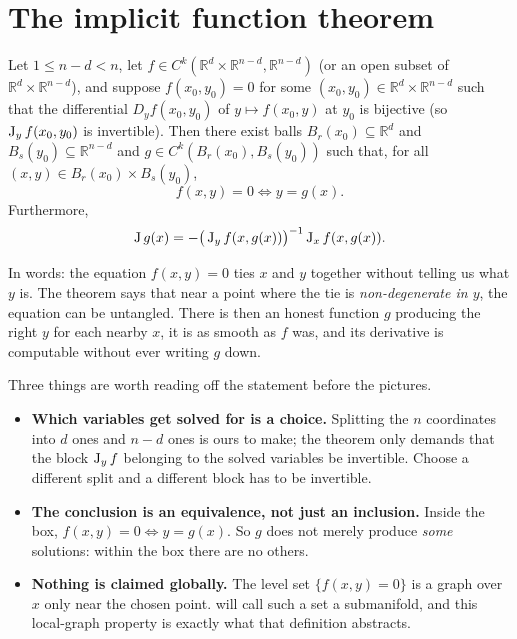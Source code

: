 
\section{The implicit function theorem}
\label{sec:implicit_function_theorem}

\begin{theorem}
\label{thm:implicit_function_theorem}
Let $1 \leq n-d < n$, let $f \in C^k(\mathbb{R}^d\times\mathbb{R}^{n-d}, \mathbb{R}^{n-d})$ (or an
open subset of $\mathbb{R}^d\times\mathbb{R}^{n-d}$), and suppose $f(x_0,y_0) = 0$ for some
$(x_0,y_0) \in \mathbb{R}^d\times\mathbb{R}^{n-d}$ such that the differential $D_yf(x_0,y_0)$ of
$y \mapsto f(x_0,y)$ at $y_0$ is bijective (so $\operatorname{J}_yf(x_0,y_0)$ is invertible). Then there exist
balls $B_r(x_0) \subseteq \mathbb{R}^d$ and $B_s(y_0) \subseteq \mathbb{R}^{n-d}$ and
$g \in C^k(B_r(x_0), B_s(y_0))$ such that, for all $(x,y) \in B_r(x_0)\times B_s(y_0)$,
\[f(x,y) = 0 \iff y = g(x).\]
Furthermore,
\[\operatorname{J} g(x) = -\big(\operatorname{J}_yf(x,g(x))\big)^{-1}\operatorname{J}_xf(x,g(x)).\]
\end{theorem}

In words: the equation $f(x,y)=0$ ties $x$ and $y$ together without telling us what $y$ is. The
theorem says that near a point where the tie is \emph{non-degenerate in $y$}, the equation can be
untangled. There is then an honest function $g$ producing the right $y$ for each nearby $x$, it is
as smooth as $f$ was, and its derivative is computable without ever writing $g$ down.

Three things are worth reading off the statement before the pictures.
\begin{itemize}
  \item \textbf{Which variables get solved for is a choice.} Splitting the $n$ coordinates into
    $d$  ones and $n-d$  ones is ours to make; the theorem only demands that
    the block $\operatorname{J}_yf$ belonging to the solved variables be invertible. Choose a different
    split and a different block has to be invertible.
  \item \textbf{The conclusion is an equivalence, not just an inclusion.} Inside the box,
    $f(x,y)=0 \iff y=g(x)$. So $g$ does not merely produce \emph{some} solutions: within the
    box there are no others.
  \item \textbf{Nothing is claimed globally.} The level set $\{f(x,y)=0\}$ is a graph over $x$
    only near the chosen point.  will call such a set a submanifold, and
    this local-graph property is exactly what that definition abstracts.
\end{itemize}

